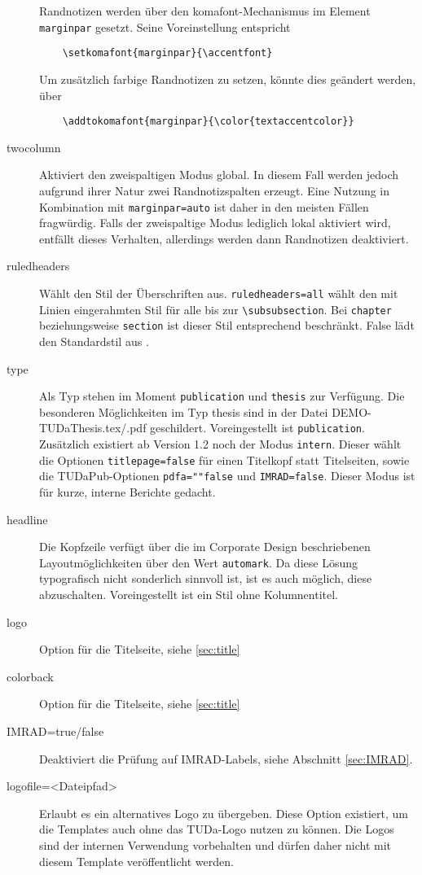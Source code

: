 \documentclass[
	ngerman,
	accentcolor=9c,%
	]{tudapub}
\let\code\texttt
\begin{document}
\begin{description}
	Randnotizen werden über den komafont-Mechanismus \cite[vgl.][]{scrguide} im Element \code{marginpar} gesetzt. Seine Voreinstellung entspricht
	\begin{verbatim}
	\setkomafont{marginpar}{\accentfont}
	\end{verbatim}
	Um zusätzlich farbige Randnotizen zu setzen, könnte dies geändert werden, über
	\begin{verbatim}
	\addtokomafont{marginpar}{\color{textaccentcolor}}
	\end{verbatim}
	\item[twocolumn] Aktiviert den zweispaltigen Modus global. In diesem Fall werden jedoch aufgrund ihrer Natur zwei Randnotizspalten erzeugt. Eine Nutzung in Kombination mit \code{marginpar=auto} ist daher in den meisten Fällen fragwürdig. Falls der zweispaltige Modus lediglich lokal aktiviert wird, entfällt dieses Verhalten, allerdings werden dann Randnotizen deaktiviert.
	\item[ruledheaders] Wählt den Stil der Überschriften aus. \code{ruledheaders=all} wählt den mit Linien eingerahmten Stil für alle bis zur \verb+\subsubsection+. Bei \code{chapter} beziehungsweise \code{section} ist dieser Stil entsprechend beschränkt. False lädt den Standardstil aus \KOMAScript.
    \item[type] Als Typ stehen im Moment \code{publication} und \code{thesis} zur Verfügung. Die besonderen Möglichkeiten im Typ thesis sind in der Datei DEMO-TUDaThesis.tex/.pdf geschildert. Voreingestellt ist \code{publication}.
	Zusätzlich existiert ab Version 1.2 noch der Modus \code{intern}. Dieser wählt die Optionen \code{titlepage=false} für einen Titelkopf statt Titelseiten, sowie die TUDaPub-Optionen \code{pdfa=""false} und \code{IMRAD=false}. Dieser Modus ist für kurze, interne Berichte gedacht.
	\item[headline] Die Kopfzeile verfügt über die im Corporate Design beschriebenen Layoutmöglichkeiten über den Wert \code{automark}. Da diese Lösung typografisch nicht sonderlich sinnvoll ist, ist es auch möglich, diese abzuschalten. Voreingestellt ist ein Stil ohne Kolumnentitel.
	\item[logo] Option für die Titelseite, siehe \ref{sec:title}
	\item[colorback] Option für die Titelseite, siehe \ref{sec:title}
	\item[IMRAD=true/false] Deaktiviert die Prüfung auf IMRAD-Labels, siehe Abschnitt \ref{sec:IMRAD}.
	\item[logofile=<Dateipfad>] Erlaubt es ein alternatives Logo zu übergeben. Diese Option existiert, um die Templates auch ohne das TUDa-Logo nutzen zu können. Die Logos sind der internen Verwendung vorbehalten und dürfen daher nicht mit diesem Template veröffentlicht werden.
\end{description}
\end{document}
